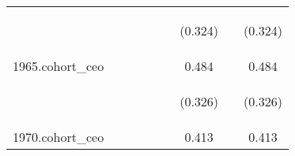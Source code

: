 \begin{center}
\begin{tabular}{lcccccccc}
\vspace{4pt} & \begin{footnotesize}\end{footnotesize} & \begin{footnotesize}\end{footnotesize} & \begin{footnotesize}\end{footnotesize} & \begin{footnotesize}\end{footnotesize} & \begin{footnotesize}\end{footnotesize} & \begin{footnotesize}(0.324)\end{footnotesize} & \begin{footnotesize}\end{footnotesize} & \begin{footnotesize}(0.324)\end{footnotesize} \\
1965.cohort\_ceo &  &  &  &  &  & 0.484 &  & 0.484 \\
\vspace{4pt} & \begin{footnotesize}\end{footnotesize} & \begin{footnotesize}\end{footnotesize} & \begin{footnotesize}\end{footnotesize} & \begin{footnotesize}\end{footnotesize} & \begin{footnotesize}\end{footnotesize} & \begin{footnotesize}(0.326)\end{footnotesize} & \begin{footnotesize}\end{footnotesize} & \begin{footnotesize}(0.326)\end{footnotesize} \\
1970.cohort\_ceo &  &  &  &  &  & 0.413 &  & 0.413 \\

\end{tabular}
\end{center}
